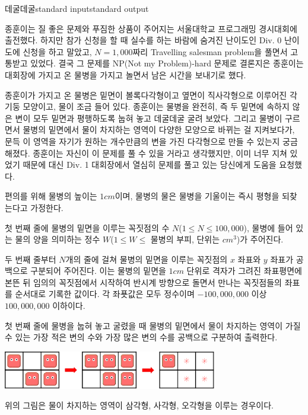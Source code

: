 \begin{problem}{데굴데굴}{standard input}{standard output}

종훈이는 질 좋은 문제와 푸짐한 상품이 주어지는 서울대학교 프로그래밍 경시대회에 출전했다. 하지만 참가 신청을 할 때 실수를 하는 바람에 숨겨진 난이도인 Div. 0 난이도에 신청을 하고 말았고, $N = 1,000$짜리 Travelling salesman problem을 풀면서 고통받고 있었다. 결국 그 문제를 NP(Not my Problem)-hard 문제로 결론지은 종훈이는 대회장에 가지고 온 물병을 가지고 놀면서 남은 시간을 보내기로 했다.

종훈이가 가지고 온 물병은 밑면이 볼록다각형이고 옆면이 직사각형으로 이루어진 각기둥 모양이고, 물이 조금 들어 있다. 종훈이는 물병을 완전히, 즉 두 밑면에 속하지 않은 변이 모두 밑면과 평행하도록 눕혀 놓고 데굴데굴 굴려 보았다. 그리고 물병이 구르면서 물병의 밑면에서 물이 차지하는 영역이 다양한 모양으로 바뀌는 걸 지켜보다가, 문득 이 영역을 자기가 원하는 개수만큼의 변을 가진 다각형으로 만들 수 있는지 궁금해졌다. 종훈이는 자신이 이 문제를 풀 수 있을 거라고 생각했지만, 이미 너무 지쳐 있었기 때문에 대신 Div. 1 대회장에서 열심히 문제를 풀고 있는 당신에게 도움을 요청했다.

편의를 위해 물병의 높이는 $1cm$이며, 물병의 물은 물병을 기울이는 즉시 평형을 되찾는다고 가정한다.

\InputFile
첫 번째 줄에 물병의 밑면을 이루는 꼭짓점의 수 $N$($1 \le N \le 100,000$), 물병에 들어 있는 물의 양을 의미하는 정수 $W$($1 \le W \le$ 물병의 부피, 단위는 $cm^{3}$)가 주어진다.

두 번째 줄부터 $N$개의 줄에 걸쳐 물병의 밑면을 이루는 꼭짓점의 $x$ 좌표와 $y$ 좌표가 공백으로 구분되어 주어진다. 이는 물병의 밑면을 $1cm$ 단위로 격자가 그려진 좌표평면에 본뜬 뒤 임의의 꼭짓점에서 시작하여 반시계 방향으로 돌면서 만나는 꼭짓점들의 좌표를 순서대로 기록한 값이다. 각 좌푯값은 모두 정수이며 $-100,000,000$ 이상 $100,000,000$ 이하이다.

\OutputFile
첫 번째 줄에 물병을 눕혀 놓고 굴렸을 때 물병의 밑면에서 물이 차지하는 영역이 가질 수 있는 가장 적은 변의 수와 가장 많은 변의 수를 공백으로 구분하여 출력한다.

\Example

\begin{example}
%
\end{example}

\Notes
\begin{center}
  \includegraphics[width=0.7\textwidth]{nemo.png}
\end{center}

위의 그림은 물이 차지하는 영역이 삼각형, 사각형, 오각형을 이루는 경우이다.

\end{problem}
